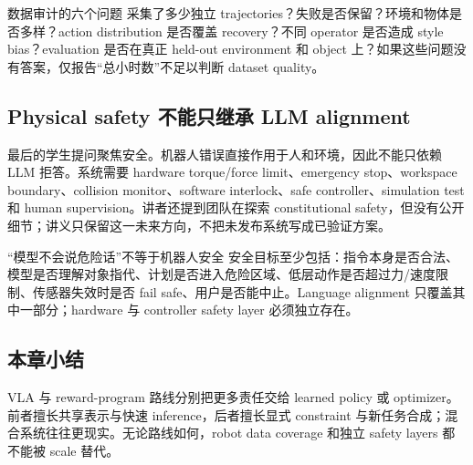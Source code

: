 \begin{knowledgebox}{数据审计的六个问题}
采集了多少独立 trajectories？失败是否保留？环境和物体是否多样？action distribution 是否覆盖 recovery？不同 operator 是否造成 style bias？evaluation 是否在真正 held-out environment 和 object 上？如果这些问题没有答案，仅报告“总小时数”不足以判断 dataset quality。
\end{knowledgebox}

\subsection{Physical safety 不能只继承 LLM alignment}

最后的学生提问聚焦安全。机器人错误直接作用于人和环境，因此不能只依赖 LLM 拒答。系统需要 hardware torque/force limit、emergency stop、workspace boundary、collision monitor、software interlock、safe controller、simulation test 和 human supervision。讲者还提到团队在探索 constitutional safety，但没有公开细节；讲义只保留这一未来方向，不把未发布系统写成已验证方案。

\begin{warningbox}{“模型不会说危险话”不等于机器人安全}
安全目标至少包括：指令本身是否合法、模型是否理解对象指代、计划是否进入危险区域、低层动作是否超过力/速度限制、传感器失效时是否 fail safe、用户是否能中止。Language alignment 只覆盖其中一部分；hardware 与 controller safety layer 必须独立存在。
\end{warningbox}


\subsection{本章小结}

VLA 与 reward-program 路线分别把更多责任交给 learned policy 或 optimizer。前者擅长共享表示与快速 inference，后者擅长显式 constraint 与新任务合成；混合系统往往更现实。无论路线如何，robot data coverage 和独立 safety layers 都不能被 scale 替代。

